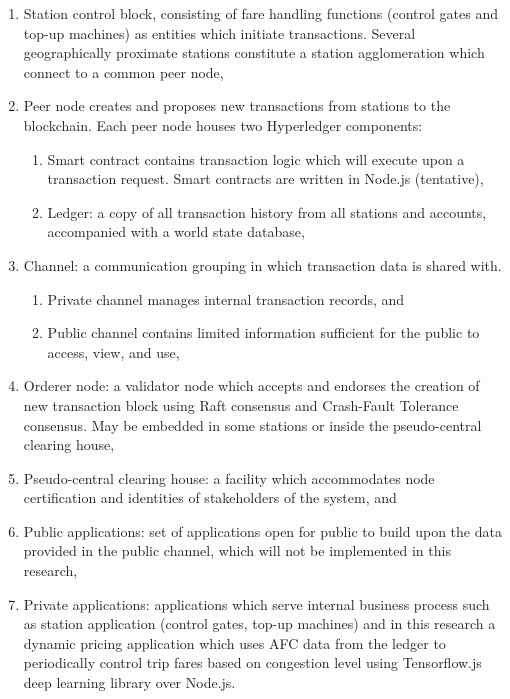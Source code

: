 \documentclass[a4paper,12pt,oneside, utf8x]{report}
\begin{document}
\begin{enumerate}
\begin{enumerate}
\item Station control block, consisting of fare handling functions (control gates and top-up machines) as entities which initiate transactions. Several geographically proximate stations constitute a station agglomeration which connect to a common peer node,
\item Peer node creates and proposes new transactions from stations to the blockchain. Each peer node houses two Hyperledger components:
\begin{enumerate}
\item Smart contract contains transaction logic which will execute upon a transaction request. Smart contracts are written in Node.js (tentative),
\item Ledger: a copy of all transaction history from all stations and accounts, accompanied with a world state database,
\end{enumerate}
\item Channel: a communication grouping in which transaction data is shared with.
\begin{enumerate}
\item Private channel manages internal transaction records, and
\item Public channel contains limited information sufficient for the public to access, view, and use,
\end{enumerate}
\item Orderer node: a validator node which accepts and endorses the creation of new transaction block using Raft consensus and Crash-Fault Tolerance consensus. May be embedded in some stations or inside the pseudo-central clearing house,
\item Pseudo-central clearing house: a facility which accommodates node certification and identities of stakeholders of the system, and
\item Public applications: set of applications open for public to build upon the data provided in the public channel, which will not be implemented in this research,
\item Private applications: applications which serve internal business process such as station application (control gates, top-up machines) and in this research a dynamic pricing application which uses AFC data from the ledger to periodically control trip fares based on congestion level using Tensorflow.js deep learning library over Node.js.
\end{enumerate}
\end{enumerate}
\end{document}
